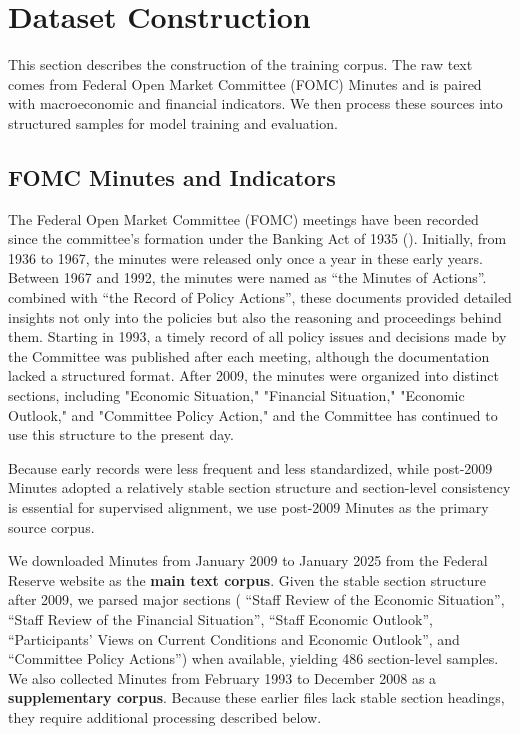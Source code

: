\newcommand{\inputtag}[1]{**\textless #1\textgreater**}



\section{Dataset Construction}\label{ch2:sec:the dataset}

This section describes the construction of the training corpus. The raw text comes from Federal Open Market Committee (FOMC) Minutes and is paired with macroeconomic and financial indicators. We then process these sources into structured samples for model training and evaluation.


\subsection*{FOMC Minutes and Indicators}\label{ch2:sec:raw_data}


The Federal Open Market Committee (FOMC) meetings have been recorded since the committee's formation under the Banking Act of 1935 (\cite{todd2016corollary}). Initially, from 1936 to 1967, the minutes were released only once a year in these early years. Between 1967 and 1992, the minutes were named as ``the Minutes of Actions''. combined with ``the Record of Policy Actions'', these documents provided detailed insights not only into the policies but also the reasoning and proceedings behind them. Starting in 1993, a timely record of all policy issues and decisions made by the Committee was published after each meeting, although the documentation lacked a structured format. After 2009, the minutes were organized into distinct sections, including "Economic Situation," "Financial Situation," "Economic Outlook," and "Committee Policy Action," and the Committee has continued to use this structure to the present day. 

Because early records were less frequent and less standardized, while post-2009 Minutes adopted a relatively stable section structure and section-level consistency is essential for supervised alignment, we use post-2009 Minutes as the primary source corpus.




We downloaded Minutes from January 2009 to January 2025 from the Federal Reserve website as the \textbf{main text corpus}. Given the stable section structure after 2009, we parsed major sections ( ``Staff Review of the Economic Situation'', ``Staff Review of the Financial Situation'', ``Staff Economic Outlook'', ``Participants' Views on Current Conditions and Economic Outlook'', and ``Committee Policy Actions'') when available, yielding 486 section-level samples. We also collected Minutes from February 1993 to December 2008 as a \textbf{supplementary corpus}. Because these earlier files lack stable section headings, they require additional processing described below.

